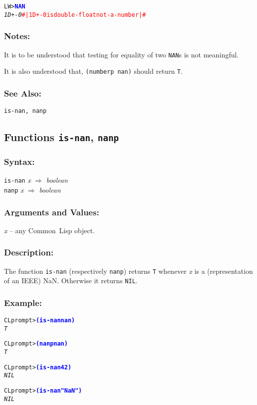 \documentclass[fleqn]{article}
\newcommand{\CL}{\textsf{Common~Lisp}}
\newcommand{\code}[1]{\texttt{#1}}
\newcommand{\varname}[1]{\textit{#1}}
\newcommand{\codeprompt}[1]{\textcolor{blue}{\textbf{#1}}}
\newcommand{\DDictionaryItem}[1]{\vspace*{6pt}\noindent\hrulefill\vspace*{-9pt}\subsection*{#1}}
\begin{document}
\begin{alltt}
LW> \codeprompt{NAN}
\textit{1D+-0} \textcolor{red}{#| 1D+-0 is double-float not-a-number |#}
\end{alltt}

\subsubsection*{Notes:}

\noindent
It is to be understood that testing for equality of two \code{NAN}s is
not meaningful.

\noindent
It is also understood that, \code{(numberp nan)} should return \code{T}.

\subsubsection*{See Also:}

\code{is-nan, nanp}


\DDictionaryItem{Functions \code{is-nan}, \code{nanp}}

\subsubsection*{Syntax:}

\code{is-nan} \varname{x} $\Rightarrow$ \textit{boolean}\\
\code{nanp} \varname{x} $\Rightarrow$ \textit{boolean}

\subsubsection*{Arguments and Values:}

\varname{x} -- any \CL{} object.

\subsubsection*{Description:}

The function \code{is-nan} (respectively \code{nanp}) returns \code{T}
whenever \varname{x} is a (representation of an IEEE) NaN.  Otherwise
it returns \code{NIL}.


\subsubsection*{Example:}

\begin{alltt}
CL prompt> \codeprompt{(is-nan nan)}
\textit{T}

CL prompt> \codeprompt{(nanp nan)}
\textit{T}

CL prompt> \codeprompt{(is-nan 42)}
\textit{NIL}

CL prompt> \codeprompt{(is-nan "NaN")}
\textit{NIL}
\end{alltt}
\end{document}
